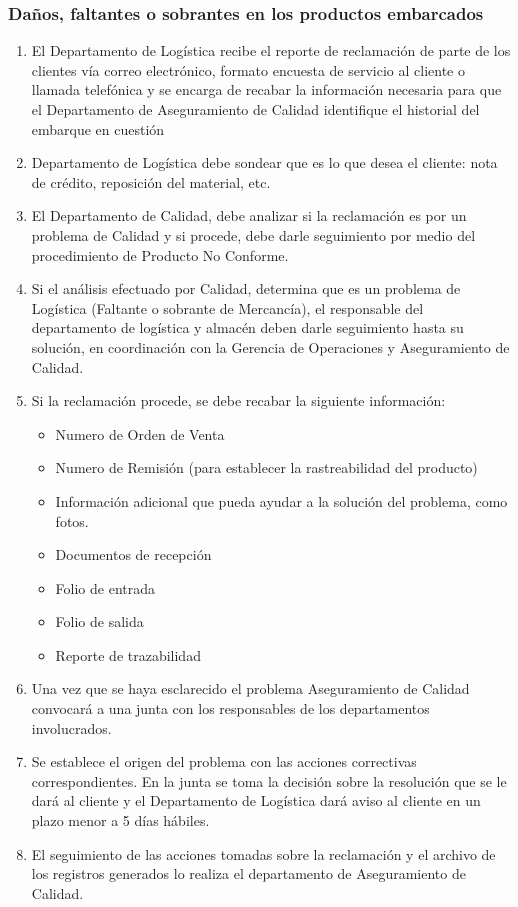 \subsubsection{Daños, faltantes o sobrantes en los productos embarcados}

\begin{enumerate}
	\item El Departamento de Logística recibe el reporte de reclamación de parte de los clientes vía correo electrónico, formato encuesta de servicio al cliente o llamada telefónica y se encarga de recabar la información necesaria para que el Departamento de Aseguramiento de Calidad identifique el historial del embarque en cuestión
	\item Departamento de Logística debe sondear que es lo que desea el cliente: nota de crédito, reposición del material, etc.
	\item El Departamento de Calidad, debe analizar si la reclamación es por un problema de Calidad y si procede, debe darle seguimiento por medio del procedimiento de Producto No Conforme.
	\item Si el análisis efectuado por Calidad, determina que es un problema de Logística (Faltante o sobrante de Mercancía), el responsable del departamento de logística y almacén deben darle seguimiento hasta su solución, en coordinación con la Gerencia de Operaciones y Aseguramiento de Calidad.
	\item Si la reclamación procede, se debe recabar la siguiente información:
	\begin{itemize}
		\item Numero de Orden de Venta
		\item Numero de Remisión (para establecer la rastreabilidad del producto)
		\item Información adicional que pueda ayudar a la solución del problema, como fotos.
		\item Documentos de recepción
		\item Folio de entrada
		\item Folio de salida
		\item Reporte de trazabilidad
	\end{itemize}
	\item Una vez que se haya esclarecido el problema Aseguramiento de Calidad convocará a una junta con los responsables de los departamentos involucrados.
	\item Se establece el origen del problema con las acciones correctivas correspondientes. En la junta se toma la decisión sobre la resolución que se le dará al cliente y el Departamento de Logística dará aviso al cliente en un plazo menor a 5 días hábiles.
	\item El seguimiento de las acciones tomadas sobre la reclamación y el archivo de los registros generados lo realiza el departamento de Aseguramiento de Calidad.
\end{enumerate}

